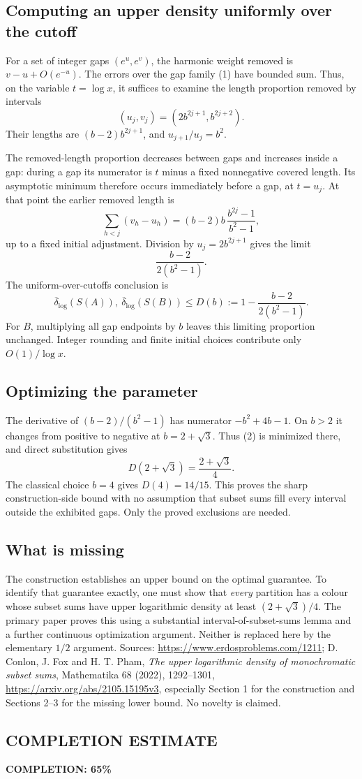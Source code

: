 \subsection*{Computing an upper density uniformly over the cutoff}
For a set of integer gaps $(e^u,e^v)$, the harmonic weight removed is
$v-u+O(e^{-u})$. The errors over the gap family (1) have bounded sum.
Thus, on the variable $t=\log x$, it suffices to examine the length proportion removed by intervals
\[
 (u_j,v_j)=(2b^{2j+1},b^{2j+2}).
\]
Their lengths are $(b-2)b^{2j+1}$, and $u_{j+1}/u_j=b^2$.

The removed-length proportion decreases between gaps and increases inside a gap: during a gap its numerator is $t$ minus a fixed nonnegative covered length. Its asymptotic minimum therefore occurs immediately before a gap, at $t=u_j$. At that point the earlier removed length is
\[
 \sum_{h<j}(v_h-u_h)
 =(b-2)b\,\frac{b^{2j}-1}{b^2-1},
\]
up to a fixed initial adjustment. Division by $u_j=2b^{2j+1}$ gives the limit
\[
 \frac{b-2}{2(b^2-1)}.
\]
The uniform-over-cutoffs conclusion is
\[
 \overline\delta_{\log}(S(A)),\
 \overline\delta_{\log}(S(B))
 \le D(b):=1-\frac{b-2}{2(b^2-1)}.
 \tag{2}
\]
For $B$, multiplying all gap endpoints by $b$ leaves this limiting proportion unchanged. Integer rounding and finite initial choices contribute only $O(1)/\log x$.

\subsection*{Optimizing the parameter}
The derivative of $(b-2)/(b^2-1)$ has numerator $-b^2+4b-1$. On $b>2$ it changes from positive to negative at $b=2+\sqrt3$. Thus (2) is minimized there, and direct substitution gives
\[
 D(2+\sqrt3)=\frac{2+\sqrt3}{4}.
\]
The classical choice $b=4$ gives $D(4)=14/15$. This proves the sharp construction-side bound with no assumption that subset sums fill every interval outside the exhibited gaps. Only the proved exclusions are needed.

\subsection*{What is missing}
The construction establishes an upper bound on the optimal guarantee. To identify that guarantee exactly, one must show that \emph{every} partition has a colour whose subset sums have upper logarithmic density at least $(2+\sqrt3)/4$. The primary paper proves this using a substantial interval-of-subset-sums lemma and a further continuous optimization argument. Neither is replaced here by the elementary $1/2$ argument.
Sources: \url{https://www.erdosproblems.com/1211}; D. Conlon, J. Fox and H. T. Pham, \emph{The upper logarithmic density of monochromatic subset sums}, Mathematika 68 (2022), 1292--1301, \url{https://arxiv.org/abs/2105.15195v3}, especially Section 1 for the construction and Sections 2--3 for the missing lower bound. No novelty is claimed.
\subsection*{COMPLETION ESTIMATE}
\textbf{COMPLETION: 65\%}

